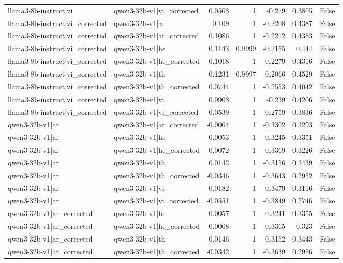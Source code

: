 \begin{table}
\begin{tabular}{l l r r r r l}
llama3-8b-instruct|vi & qwen3-32b-v1|vi_corrected & 0.0508 & 1 & -0.279 & 0.3805 & False \\
llama3-8b-instruct|vi_corrected & qwen3-32b-v1|ar & 0.109 & 1 & -0.2208 & 0.4387 & False \\
llama3-8b-instruct|vi_corrected & qwen3-32b-v1|ar_corrected & 0.1086 & 1 & -0.2212 & 0.4383 & False \\
llama3-8b-instruct|vi_corrected & qwen3-32b-v1|he & 0.1143 & 0.9999 & -0.2155 & 0.444 & False \\
llama3-8b-instruct|vi_corrected & qwen3-32b-v1|he_corrected & 0.1018 & 1 & -0.2279 & 0.4316 & False \\
llama3-8b-instruct|vi_corrected & qwen3-32b-v1|th & 0.1231 & 0.9997 & -0.2066 & 0.4529 & False \\
llama3-8b-instruct|vi_corrected & qwen3-32b-v1|th_corrected & 0.0744 & 1 & -0.2553 & 0.4042 & False \\
llama3-8b-instruct|vi_corrected & qwen3-32b-v1|vi & 0.0908 & 1 & -0.239 & 0.4206 & False \\
llama3-8b-instruct|vi_corrected & qwen3-32b-v1|vi_corrected & 0.0539 & 1 & -0.2759 & 0.3836 & False \\
qwen3-32b-v1|ar & qwen3-32b-v1|ar_corrected & -0.0004 & 1 & -0.3302 & 0.3293 & False \\
qwen3-32b-v1|ar & qwen3-32b-v1|he & 0.0053 & 1 & -0.3245 & 0.3351 & False \\
qwen3-32b-v1|ar & qwen3-32b-v1|he_corrected & -0.0072 & 1 & -0.3369 & 0.3226 & False \\
qwen3-32b-v1|ar & qwen3-32b-v1|th & 0.0142 & 1 & -0.3156 & 0.3439 & False \\
qwen3-32b-v1|ar & qwen3-32b-v1|th_corrected & -0.0346 & 1 & -0.3643 & 0.2952 & False \\
qwen3-32b-v1|ar & qwen3-32b-v1|vi & -0.0182 & 1 & -0.3479 & 0.3116 & False \\
qwen3-32b-v1|ar & qwen3-32b-v1|vi_corrected & -0.0551 & 1 & -0.3849 & 0.2746 & False \\
qwen3-32b-v1|ar_corrected & qwen3-32b-v1|he & 0.0057 & 1 & -0.3241 & 0.3355 & False \\
qwen3-32b-v1|ar_corrected & qwen3-32b-v1|he_corrected & -0.0068 & 1 & -0.3365 & 0.323 & False \\
qwen3-32b-v1|ar_corrected & qwen3-32b-v1|th & 0.0146 & 1 & -0.3152 & 0.3443 & False \\
qwen3-32b-v1|ar_corrected & qwen3-32b-v1|th_corrected & -0.0342 & 1 & -0.3639 & 0.2956 & False \\

\end{tabular}
\end{table}
